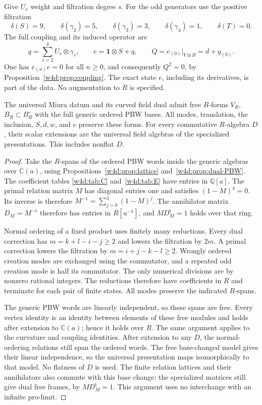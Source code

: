 Give $U_s$ weight and filtration degree $s$.
For the odd generators use the positive filtration
\[
 \delta(S)=9,\qquad\delta(\gamma_2)=5,\qquad
 \delta(\gamma_3)=3,\qquad\delta(\gamma_4)=1,
 \qquad\delta(T)=0.
\]
The full coupling and its induced operator are
\[
 q=\sum_{s=2}^4U_s\otimes\gamma_s,\qquad
 e=\mathbf1\otimes S+q,\qquad
 Q=e_{(0)}|_{V\otimes B}=d+q_{(0)}.
\]
One has $e_{(n)}e=0$ for all $n\geq0$, and consequently $Q^2=0$,
by Proposition~\ref{w4d:prop:coupling}. The exact state $e$, including
its derivatives, is part of the data. No augmentation to $R$ is specified.

\begin{lemma}\label{rpd:lem:polynomial}
The universal Miura datum and its curved field dual admit free
$R$-forms $V_R$, $B_R\subset B_R^\circ$ with the full generic ordered PBW
bases. All modes, translation, the inclusion, $S,d,w$, and $e$ preserve
these forms. For every commutative $R$-algebra $D$, their scalar
extensions are the universal field algebras of the specialized
presentations. This includes nonflat $D$.
\end{lemma}
\begin{proof}
Take the $R$-spans of the ordered PBW words inside the generic algebras
over $\mathbb C(a)$, using Propositions~\ref{w4d:prop:lattice}
and~\ref{w4d:prop:dual-PBW}. The coefficient tables
\ref{w4d:tab:C} and~\ref{w4d:tab:E} have entries in $\mathbb Q[a]$.
The primal relation matrix $M$ has diagonal entries one and satisfies
$(1-M)^4=0$. Its inverse is therefore
$M^{-1}=\sum_{j=0}^3(1-M)^j$. The annihilator matrix
$D_M=M^{-\mathrm t}$ therefore has entries in $R[u^{-1}]$,
and $MD_M^{\mathrm t}=1$ holds over that ring.

Normal ordering of a fixed product uses finitely many reductions.
Every dual correction has $m=k+l-i-j\geq2$ and lowers the
filtration by $2m$. A primal correction lowers the filtration by
$m=i+j-k-l\geq2$. Wrongly ordered
creation modes are exchanged using the commutator, and a repeated odd
creation mode is half its commutator. The only numerical divisions are
by nonzero rational integers. The reductions therefore have
coefficients in $R$ and terminate for each pair of finite states.
All modes preserve the indicated $R$-spans.

The generic PBW words are linearly independent, so these spans are
free. Every vertex identity is an identity between elements of these
free modules and holds after extension to $\mathbb C(a)$; hence it holds
over $R$. The same argument applies to the curvature and coupling
identities. After extension to any $D$, the normal-ordering relations
still span the ordered words. The free base-changed model gives their
linear independence, so the universal presentation maps isomorphically
to that model. No flatness of $D$ is used.
The finite relation lattices and their annihilators also commute with
this base change: the specialized matrices still give dual free frames,
by $MD_M^{\mathrm t}=1$. This argument uses no interchange with an
infinite pro-limit.\qedhere
\end{proof}

